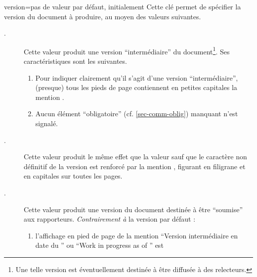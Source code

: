 {
  \begin{docKey}{version}{=\textbar{}\textbar{}\textbar{}\textbar{}\textbar{}}{pas
      de valeur par défaut, initialement }
    Cette clé permet de spécifier la version du document à produire, au moyen
    des valeurs suivantes.
    \begin{description}
    \item[.]%
      Cette valeur produit une version
      \enquote{intermédiaire} du document\footnote{Une telle version est
        éventuellement destinée à être diffusée à des relecteurs.}. Ses
      caractéristiques sont les suivantes.
      \begin{enumerate}
      \item\label{item:inprogress:1} Pour indiquer clairement qu'il s'agit d'une
        version \enquote{intermédiaire}, (presque) tous les pieds de
        page contiennent en petites capitales la mention
        .
      \item\label{item:inprogress:2} Aucun élément \enquote{obligatoire}
        (cf. \vref{sec-comm-oblig}) manquant n'est signalé.
      \end{enumerate}
    \item[.]%
      Cette valeur produit le même effet que la valeur 
      sauf que le caractère non définitif de la version est renforcé par la
      mention , figurant en
      filigrane et en capitales sur toutes les pages.
    \item[.]%
      Cette valeur produit une version du document
      destinée à être \enquote{soumise} aux rapporteurs. \emph{Contrairement à}
      la version par défaut :
      \begin{enumerate}
      \item l'affichage en pied de page de la mention
        \enquote{Version intermédiaire en date du } ou
        \foreignquote{english}{Work in progress as of } est

\end{enumerate}
\end{description}
\end{docKey}}
